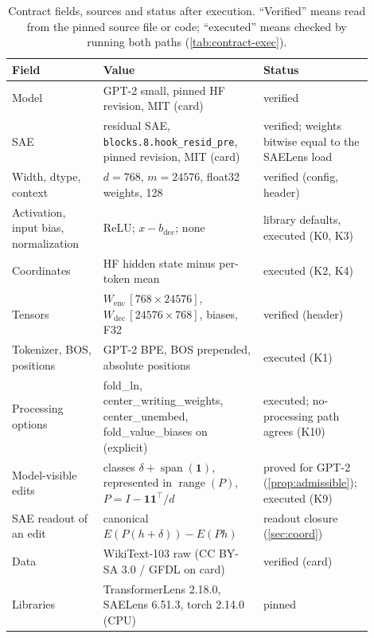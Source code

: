 \documentclass{article}
\theoremstyle{plain}
\theoremstyle{definition}
\theoremstyle{remark}
\begin{document}
\begin{table}[h]
  \caption{Contract fields, sources and status after execution. ``Verified'' means read from
  the pinned source file or code; ``executed'' means checked by running both paths
  (\cref{tab:contract-exec}).}
  \label{tab:contract}
  \centering
  \small
  \begin{tabular}{>{\raggedright\arraybackslash}p{0.24\linewidth}>{\raggedright\arraybackslash}p{0.42\linewidth}>{\raggedright\arraybackslash}p{0.24\linewidth}}
    \toprule
    Field & Value & Status \\
    \midrule
    Model & GPT-2 small, pinned HF revision, MIT (card) & verified \\
    SAE & residual SAE, \texttt{blocks.8.hook\_resid\_pre}, pinned revision, MIT (card) & verified; weights bitwise equal to the SAELens load \\
    Width, dtype, context & $d=768$, $m=24576$, float32 weights, 128 & verified (config, header) \\
    Activation, input bias, normalization & ReLU; $x - b_{\mathrm{dec}}$; none & library defaults, executed (K0, K3) \\
    Coordinates & HF hidden state minus per-token mean & executed (K2, K4) \\
    Tensors & $W_{\mathrm{enc}}\,[768{\times}24576]$, $W_{\mathrm{dec}}\,[24576{\times}768]$, biases, F32 & verified (header) \\
    Tokenizer, BOS, positions & GPT-2 BPE, BOS prepended, absolute positions & executed (K1) \\
    Processing options & fold\_ln, center\_writing\_weights, center\_unembed, fold\_value\_biases on (explicit) & executed; no-processing path agrees (K10) \\
    Model-visible edits & classes $\delta+\operatorname{span}(\mathbf{1})$, represented in $\operatorname{range}(P)$, \mbox{$P = I - \mathbf{1}\mathbf{1}^{\top}/d$} & proved for GPT-2 (\cref{prop:admissible}); executed (K9) \\
    SAE readout of an edit & canonical $E(P(h+\delta)) - E(Ph)$ & readout closure (\cref{sec:coord}) \\
    Data & WikiText-103 raw (CC BY-SA 3.0 / GFDL on card) & verified (card) \\
    Libraries & TransformerLens 2.18.0, SAELens 6.51.3, torch 2.14.0 (CPU) & pinned \\
    \bottomrule
  \end{tabular}
\end{table}
\end{document}
